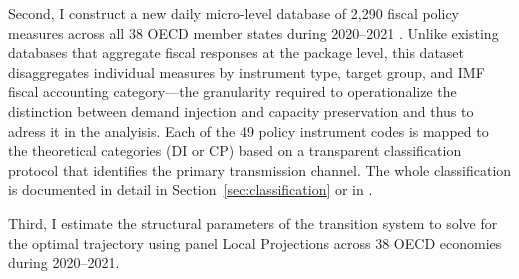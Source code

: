 \documentclass[12pt, a4paper]{article}
\begin{document}
Second, I construct a new daily micro-level database of 2,290 fiscal policy measures across all 38 OECD member states during 2020--2021 \citep{pesenti2025}. Unlike existing databases that aggregate fiscal responses at the package level, this dataset disaggregates individual measures by instrument type, target group, and IMF fiscal accounting category---the granularity required to operationalize the distinction between demand injection and capacity preservation and thus to adress it in the analyisis. Each of the 49 policy instrument codes is mapped to the theoretical categories (DI or CP) based on a transparent classification protocol that identifies the primary transmission channel. The whole  classification is documented in detail in Section~\ref{sec:classification} or in \citep{Codebook}. 



Third, I estimate the structural parameters of the transition system to solve for the optimal trajectory using panel Local Projections \citep{jorda2025} across 38 OECD economies during 2020--2021. 

\end{document}
